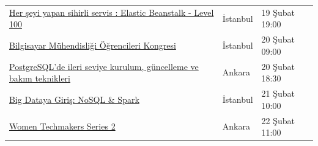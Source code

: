\documentclass[11pt]{article}
\begin{document}
\begin{longtable}{|p{8cm}|l|l|}
\href{https://www.meetup.com/AWS-User-Group-Turkey/events/268534271/}{Her şeyi yapan sihirli servis : Elastic Beanstalk - Level 100} & İstanbul & 19 Şubat 19:00\\
\href{https://www.eventbrite.com/e/bilmok-2020-registration-58358884996}{Bilgisayar Mühendisliği Öğrencileri Kongresi} & İstanbul & 20 Şubat 09:00\\
\href{https://kommunity.com/pgtr/events/ankara-postgresqlde-ileri-seviye-kurulum-guncelleme-ve-bakim-teknikleri}{PostgreSQL'de ileri seviye kurulum, güncelleme ve bakım teknikleri} & Ankara & 20 Şubat 18:30\\
\href{https://www.meetup.com/istanbul-yapay-zeka-toplulugu/events/268536570/}{Big Dataya Giriş: NoSQL \& Spark} & İstanbul & 21 Şubat 10:00\\
\href{https://www.meetup.com/GDGAnkara/events/268398519/}{Women Techmakers Series 2} & Ankara & 22 Şubat 11:00\\
\hline
\end{longtable}
\end{document}
